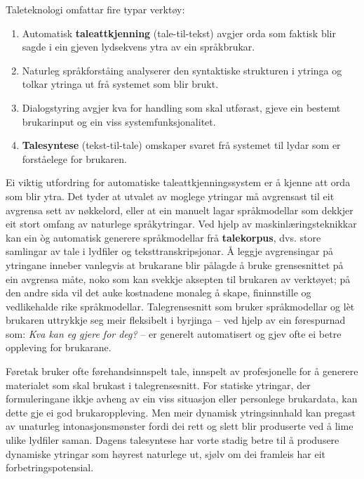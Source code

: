 \begin{multicols}{2}
Taleteknologi omfattar fire typar verktøy: 

\begin{enumerate}
\item Automatisk \textbf{taleattkjenning} (tale-til-tekst) avgjer orda som faktisk blir sagde i ein gjeven lydsekvens ytra av ein språkbrukar.
\item Naturleg språkforståing analyserer den syntaktiske strukturen i ytringa og tolkar ytringa ut frå systemet som blir brukt.
\item Dialogstyring avgjer kva for handling som skal utførast, gjeve ein bestemt brukarinput og ein viss systemfunksjonalitet.
\item \textbf{Talesyntese} (tekst-til-tale) omskaper svaret frå systemet til lydar som er forståelege for brukaren.
\end{enumerate}

Ei viktig utfordring for automatiske taleattkjenningssystem er å kjenne att orda som blir ytra. Det tyder at utvalet av moglege ytringar må avgrensast til eit avgrensa sett av nøkkelord, eller at ein manuelt lagar språkmodellar som dekkjer eit stort omfang av naturlege språkytringar. Ved hjelp av maskinlæringsteknikkar kan ein òg automatisk generere språkmodellar frå \textbf{talekorpus}, dvs. store samlingar av tale i lydfiler og teksttranskripsjonar. Å leggje avgrensingar på ytringane inneber vanlegvis at brukarane blir pålagde å bruke grensesnittet på ein avgrensa måte, noko som kan svekkje aksepten til brukaren av verktøyet; på den andre sida vil det auke kostnadene monaleg å skape, fininnstille og vedlikehalde rike språkmodellar. Talegrensesnitt som bruker språkmodellar og lèt brukaren uttrykkje seg meir fleksibelt i byrjinga – ved hjelp av ein førespurnad som: \textit{Kva kan eg gjere for deg?} – er generelt automatisert og gjev ofte ei betre oppleving for brukarane.


Føretak bruker ofte førehandsinnspelt tale, innspelt av profesjonelle for å generere materialet som skal brukast i talegrensesnitt. For statiske ytringar, der formuleringane ikkje avheng av ein viss situasjon eller personlege brukardata, kan dette gje ei god brukaroppleving. Men meir dynamisk ytringsinnhald kan pregast av unaturleg intonasjonsmønster fordi dei rett og slett blir produserte ved å lime ulike lydfiler saman. Dagens talesyntese har vorte stadig betre til å produsere dynamiske ytringar som høyrest naturlege ut, sjølv om dei framleis har eit forbetringspotensial. 


\end{multicols}
